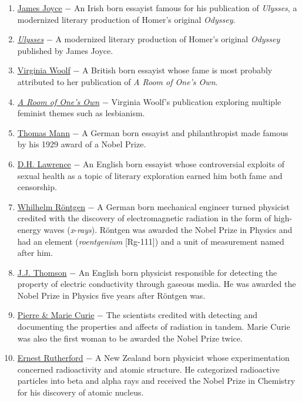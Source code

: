 \documentclass[12pt]{article}
\begin{document}
\begin{flushleft}
\begin{enumerate}
\item \underline{James Joyce} $-$ An Irish born essayist famous for his publication of \emph{Ulysses}, a modernized literary production of Homer's original \emph{Odyssey}.

\item \underline{\emph{Ulysses}} $-$ A modernized literary production of Homer's original \emph{Odyssey} published by James Joyce.

\item \underline{Virginia Woolf} $-$ A British born essayist whose fame is most probably attributed to her publication of \emph{A Room of One's Own}. 

\item \underline{\emph{A Room of One's Own}} $-$ Virginia Woolf's publication exploring multiple feminist themes such as lesbianism.

\item \underline{Thomas Mann} $-$ A German born essayist and philanthropist made famous by his 1929 award of a Nobel Prize.

\item \underline{D.H. Lawrence} $-$ An English born essayist whose controversial exploits of sexual health as a topic of literary exploration earned him both fame and censorship.

\item \underline{Whilhelm R\"ontgen} $-$ A German born mechanical engineer turned physicist credited with the discovery of electromagnetic radiation in the form of high-energy waves (\emph{x}-\emph{rays}). R\"ontgen was awarded the Nobel Prize in Physics and had an element (\emph{roentgenium} [Rg-111]) and a unit of measurement named after him.  

\item \underline{J.J. Thomson} $-$ An English born physicist responsible for detecting the property of electric conductivity through gaseous media. He was awarded the Nobel Prize in Physics five years after R\"ontgen was.

\item \underline{Pierre \& Marie Curie} $-$ The scientists credited with detecting and documenting the properties and affects of radiation in tandem. Marie Curie was also the first woman to be awarded the Nobel Prize twice.

\item \underline{Ernest Rutherford} $-$ A New Zealand born physicist whose experimentation concerned radioactivity and atomic structure. He categorized radioactive particles into beta and alpha rays and received the Nobel Prize in Chemistry for his discovery of atomic nucleus.


\end{enumerate}
\end{flushleft}
\end{document}
